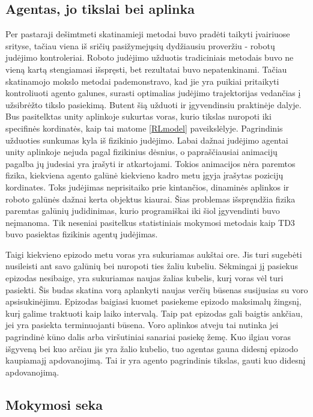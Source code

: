 \documentclass[a4paper, 12pt]{article}
\begin{document}
\subsection{Agentas, jo tikslai bei aplinka}

Per pastaraji dešimtmeti skatinamieji metodai buvo pradėti taikyti įvairiuose srityse, tačiau viena iš sričių pasižymejųsių dydžiausiu proveržiu - robotų judėjimo kontroleriai. Roboto judėjimo užduotis tradiciniais metodais buvo ne vieną kartą stengiamasi išspręsti, bet rezultatai buvo nepatenkinami. Tačiau skatinamojo mokslo metodai pademonstravo, kad jie yra puikiai pritaikyti kontroliuoti agento galunes, surasti optimalias judėjimo trajektorijas vedančias į užsibrėžto tikslo pasiekimą. Butent šią užduoti ir įgyvendinsiu praktinėje dalyje. Bus pasitelktas unity aplinkoje sukurtas voras, kurio tikslas nuropoti iki specifinės kordinatės, kaip tai matome \ref{RLmodel} paveikslėlyje. Pagrindinis užduoties sunkumas kyla iš fizikinio judėjimo. Labai dažnai judėjimo agentai unity aplinkoje nejuda pagal fizikinius dėsnius, o papraščiausiai animacijų pagalba jų judesiai yra įrašyti ir atkartojami. Tokios animacijos nėra paremtos fizika, kiekviena agento galūnė kiekvieno kadro metu įgyja įrašytas pozicijų kordinates. Toks judėjimas neprisitaiko prie kintančios, dinaminės aplinkos ir roboto galūnės dažnai kerta objektus kiaurai. Šias problemas išspręndžia fizika paremtas galūnių judidinimas, kurio programiškai iki šiol įgyvendinti buvo neįmanoma. Tik neseniai pasitelkus statistiniais mokymosi metodais kaip TD3 buvo pasiektas fizikinis agentų judėjimas.

Taigi kiekvieno epizodo metu voras yra sukuriamas aukštai ore. Jis turi sugebėti nusileisti ant savo galūnių bei nuropoti ties žaliu kubeliu. Sėkmingai jį pasiekus epizodas nesibaige, yra sukuriamas naujas žalias kubelis, kurį voras vėl turi pasiekti. Šis budas skatina vorą aplankyti naujas verčių būsenas susijusias su voro apsisukinėjimu. Epizodas baigiasi kuomet pasiekeme epizodo maksimalų žingsnį, kurį galime traktuoti kaip laiko intervalą. Taip pat epizodas gali baigtis ankčiau, jei yra pasiekta terminuojanti būsena. Voro aplinkos atveju tai nutinka jei pagrindinė kūno dalis arba viršutiniai sanariai pasiekę žemę. Kuo ilgiau voras išgyveną bei kuo arčiau jis yra žalio kubelio, tuo agentas gauna didesnį epizodo kaupiamajį apdovanojimą. Tai ir yra agento pagrindinis tikslas, gauti kuo didesnį apdovanojimą. 

\subsection{Mokymosi seka}
\end{document}
